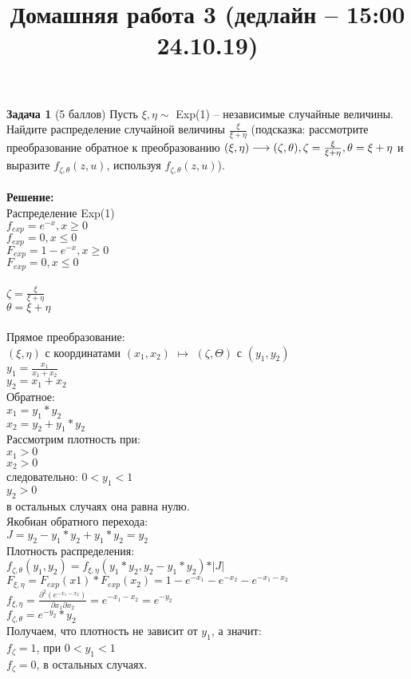 \documentclass{article}
\title{Домашняя работа 3 (дедлайн -- 15:00 24.10.19)}
\begin{document}
\maketitle
\textbf{Задача 1} (5 баллов)
Пусть $\xi, \eta \sim$ Exp(1) -- независимые случайные величины. Найдите распределение случайной величины $\frac{\xi}{\xi + \eta}$ (подсказка: рассмотрите преобразование обратное к преобразованию $(\xi, \eta) \longrightarrow (\zeta,\theta), \space \zeta = \frac{\xi}{\xi + \eta}, \space \theta = \xi + \eta$ и выразите $f_{\zeta, \theta}(z, u)$, используя $f_{\zeta, \theta}(z, u)$).\\
\\
\textbf{Решение:} \\
Распределение Exp(1)\\
$f_{exp} = e^{-x}, x \geq 0$\\
$f_{exp} = 0, x \leq 0$\\
$F_{exp} = 1 - e^{-x}, x \geq 0$\\
$F_{exp} = 0, x \leq 0$\\
\\
$\zeta = \frac{\xi}{\xi + \eta}$\\
$\theta = \xi + \eta$\\
\\
Прямое преобразование:\\
$(\xi, \eta)$ с координатами $(x_1, x_2)$ $\mapsto$ $(\zeta, \Theta)$ с $(y_1, y_2)$\\
$y_1 = \frac{x_1}{x_1 + x_2}$\\
$y_2 = x_1 + x_2$\\
Обратное:\\
$x_1 = y_1*y_2$\\
$x_2 = y_2 + y_1*y_2$\\
Рассмотрим плотность при:\\
$x_1 > 0$\\
$x_2 > 0$\\
следовательно:
$0 < y_1 < 1$\\
$y_2 > 0$\\
в остальных случаях она равна нулю.\\
Якобиан обратного перехода:\\
$J = y_2 - y_1*y_2 + y_1*y_2 = y_2$\\
Плотность распределения:\\
$f_{\zeta,\theta}(y_1, y_2) = f_{\xi,\eta}(y_1*y_2, y_2 - y_1*y_2)*\vert J\vert$\\
$F_{\xi,\eta} = F_{exp}(x1)*F_{exp}(x_2) = 1 - e^{-x_1} - e^{-x_2} - e^{-x_1 - x_2}$\\
$f_{\xi,\eta} = \frac{\partial^2(e^{-x_1 - x_2})}{\partial x_1\partial x_2} = e^{-x_1 - x_2} = e^{-y_2}$\\
$f_{\zeta,\theta} = e^{-y_2}*y_2$\\
Получаем, что плотность не зависит от $y_1$, а значит:\\
$f_{\zeta} = 1$, при $0 < y_1 < 1$\\
$f_{\zeta} = 0$, в остальных случаях.\\
\end{document}
